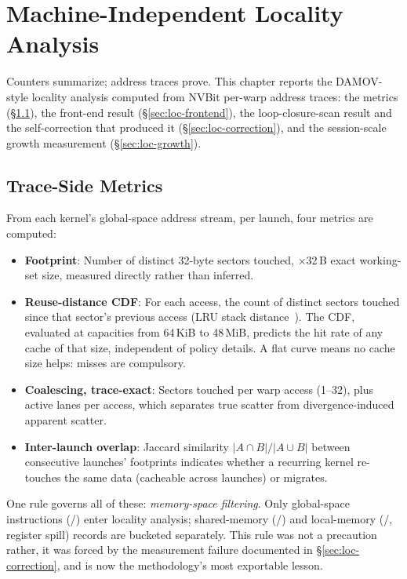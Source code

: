 \chapter{Machine-Independent Locality Analysis}
\label{ch:locality}

Counters summarize; address traces prove. This chapter reports the DAMOV-style locality analysis computed from NVBit per-warp address traces: the metrics (\S\ref{sec:loc-metrics}), the front-end result (\S\ref{sec:loc-frontend}), the loop-closure-scan result and the self-correction that produced it (\S\ref{sec:loc-correction}), and the session-scale growth measurement (\S\ref{sec:loc-growth}).

\section{Trace-Side Metrics}
\label{sec:loc-metrics}

From each kernel's global-space address stream, per launch, four metrics are computed:

\begin{itemize}
  \item \textbf{Footprint}: Number of distinct 32-byte sectors touched, $\times$32\,B exact working-set size, measured directly rather than inferred.
  \item \textbf{Reuse-distance CDF}: For each access, the count of distinct sectors touched since that sector's previous access (LRU stack distance~\cite{mattson1970stack}). The CDF, evaluated at capacities from 64\,KiB to 48\,MiB, predicts the hit rate of any cache of that size, independent of policy details. A flat curve means no cache size helps: misses are compulsory.
  \item \textbf{Coalescing, trace-exact}: Sectors touched per warp access (1--32), plus active lanes per access, which separates true scatter from divergence-induced apparent scatter.
  \item \textbf{Inter-launch overlap}: Jaccard similarity $|A \cap B|/|A \cup B|$ between consecutive launches' footprints indicates whether a recurring kernel re-touches the same data (cacheable across launches) or migrates.
\end{itemize}

One rule governs all of these: \emph{memory-space filtering}. Only global-space instructions (/) enter locality analysis; shared-memory (/) and local-memory (/, register spill) records are bucketed separately. This rule was not a precaution rather, it was forced by the measurement failure documented in \S\ref{sec:loc-correction}, and is now the methodology's most exportable lesson.

